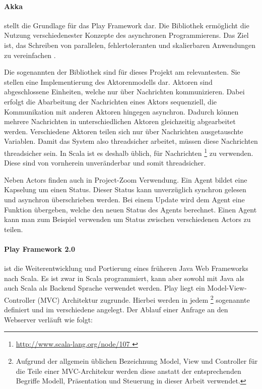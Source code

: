 \paragraph{Akka} stellt die Grundlage für das Play Framework dar. Die Bibliothek ermöglicht die Nutzung verschiedenester Konzepte des asynchronen Programmierens. Das Ziel ist, das Schreiben von parallelen, fehlertoleranten und skalierbaren Anwendungen zu vereinfachen \cite{what-is-akka}. 

Die sogenannten  der Bibliothek sind für dieses Projekt am relevantesten. Sie stellen eine Implementierung des Aktorenmodells dar. Aktoren sind abgeschlossene Einheiten, welche nur über Nachrichten kommunizieren. Dabei erfolgt die Abarbeitung der Nachrichten eines Aktors sequenziell, die Kommunikation mit anderen Aktoren hingegen asynchron. Dadurch können mehrere Nachrichten in unterschiedlichen Aktoren gleichzeitig abgearbeitet werden. Verschiedene Aktoren teilen sich nur über Nachrichten ausgetauschte Variablen. Damit das System also threadsicher arbeitet, müssen diese Nachrichten threadsicher sein. In Scala ist es deshalb üblich, für Nachrichten \footnote{\url{ http://www.scala-lang.org/node/107 }} zu verwenden. Diese sind von vornherein unveränderbar und somit threadsicher.

Neben Actors finden auch  in Project-Zoom Verwendung. Ein Agent bildet eine Kapselung um einen Status. Dieser Status kann unverzüglich synchron gelesen und asynchron überschrieben werden. Bei einem Update wird dem Agent eine Funktion übergeben, welche den neuen Status des Agents berechnet. Einen Agent kann man zum Beispiel verwenden um Status zwischen verschiedenen Actors zu teilen.

\paragraph{Play Framework 2.0} ist die Weiterentwicklung  und Portierung eines früheren Java Web Frameworks nach Scala. Es ist zwar in Scala programmiert, kann aber sowohl mit Java als auch Scala als Backend Sprache verwendet werden. Play liegt ein Model-View-Controller (MVC) Architektur zugrunde. Hierbei werden in jedem \footnote{Aufgrund der allgemein üblichen Bezeichnung Model, View und Controller für die Teile einer MVC-Architekur werden diese anstatt der entsprechenden Begriffe Modell, Präsentation und Steuerung in dieser Arbeit verwendet.} sogenannte  definiert und im  verschiedene  angelegt. Der Ablauf einer Anfrage an den Webserver verläuft wie folgt:

